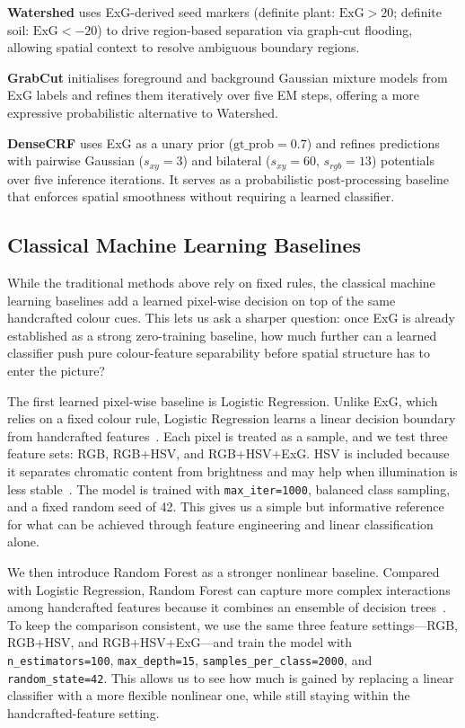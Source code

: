 \documentclass[conference]{IEEEtran}
\begin{document}
\textbf{Watershed} uses ExG-derived seed markers (definite plant:
$\text{ExG}>20$; definite soil: $\text{ExG}<-20$) to drive
region-based separation via graph-cut flooding, allowing spatial
context to resolve ambiguous boundary regions.

\textbf{GrabCut} initialises foreground and background Gaussian mixture
models from ExG labels and refines them iteratively over five
EM steps, offering a more expressive probabilistic alternative to
Watershed.

\textbf{DenseCRF} uses ExG as a unary prior ($\text{gt\_prob}{=}0.7$)
and refines predictions with pairwise Gaussian ($s_{xy}{=}3$) and
bilateral ($s_{xy}{=}60$, $s_{rgb}{=}13$) potentials over five
inference iterations. It serves as a probabilistic post-processing
baseline that enforces spatial smoothness without requiring a learned
classifier.

\subsection{Classical Machine Learning Baselines}

While the traditional methods above rely on fixed rules, the classical
machine learning baselines add a learned pixel-wise decision on top of
the same handcrafted colour cues. This lets us ask a sharper question:
once ExG is already established as a strong zero-training baseline, how
much further can a learned classifier push pure colour-feature
separability before spatial structure has to enter the picture?

The first learned pixel-wise baseline is Logistic Regression. Unlike
ExG, which relies on a fixed colour rule, Logistic Regression learns a
linear decision boundary from handcrafted features~\cite{hosmer2013}.
Each pixel is treated as a sample, and we
test three feature sets: RGB, RGB+HSV, and RGB+HSV+ExG. HSV is included
because it separates chromatic content from brightness and may help when
illumination is less stable~\cite{smith1978}. The model is trained with
\texttt{max\_iter=1000}, balanced class sampling, and a fixed random
seed of 42. This gives us a simple but informative reference for what
can be achieved through feature engineering and linear classification
alone.

We then introduce Random Forest as a stronger nonlinear baseline.
Compared with Logistic Regression, Random Forest can capture more
complex interactions among handcrafted features because it combines an
ensemble of decision trees~\cite{breiman2001}. To keep the comparison
consistent, we use the same three feature settings---RGB, RGB+HSV, and
RGB+HSV+ExG---and train the model with \texttt{n\_estimators=100},
\texttt{max\_depth=15}, \texttt{samples\_per\_class=2000}, and
\texttt{random\_state=42}. This allows us to see how much is gained by
replacing a linear classifier with a more flexible nonlinear one, while
still staying within the handcrafted-feature setting.
\end{document}
